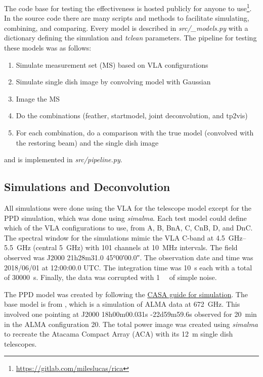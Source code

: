 \documentclass[preprint]{aastex63}
\begin{document}
The code base for testing the effectiveness is hosted publicly for anyone to use\footnote{\url{https://gitlab.com/mileslucas/rica}}. In the source code there are many scripts and methods to facilitate simulating, combining, and comparing. Every model is described in \textit{src/\_models.py} with a dictionary defining the simulation and \textit{tclean} parameters. The pipeline for testing these models was as follows:
\begin{enumerate}
    \item Simulate measurement set (MS) based on VLA configurations
    \item Simulate single dish image by convolving model with Gaussian
    \item Image the MS 
    \item Do the combinations (feather, startmodel, joint deconvolution, and tp2vis)
    \item For each combination, do a comparison with the true model (convolved with the restoring beam) and the single dish image
\end{enumerate}
and is implemented in \textit{src/pipeline.py}. 

\subsection{Simulations and Deconvolution}
All simulations were done using the VLA for the telescope model except for the PPD simulation, which was done using \textit{simalma}. Each test model could define which of the VLA configurations to use, from A, B, BnA, C, CnB, D, and DnC. The spectral window for the simulations mimic the VLA C-band at \SIrange{4.5}{5.5}{\giga\hertz} (central \SI{5}{\giga\hertz}) with 101 channels at \SI{10}{\mega\hertz} intervals. The field observed was J2000 21h28m31.0 \ang{45;00;00.0}. The observation date and time was 2018/06/01 at 12:00:00.0 UTC. The integration time was \SI{10}{\second} each with a total of \SI{30000}{\second}. Finally, the data was corrupted with \SI{1}{\milli\jansky} of simple noise.

The PPD model was created by following the \href{https://casaguides.nrao.edu/index.php/Protoplanetary_Disk_Simulation_(CASA_5.1)}{CASA guide for simulation}. The base model is from \citet{2005ApJ...619.1114W}, which is a simulation of ALMA data at \SI{672}{\giga\hertz}. This involved one pointing at J2000 18h00m00.031s -22d59m59.6s observed for \SI{20}{\minute} in the ALMA configuration 20. The total power image was created using \textit{simalma} to recreate the Atacama Compact Array (ACA) with its \SI{12}{\meter} single dish telescopes. 
\end{document}
